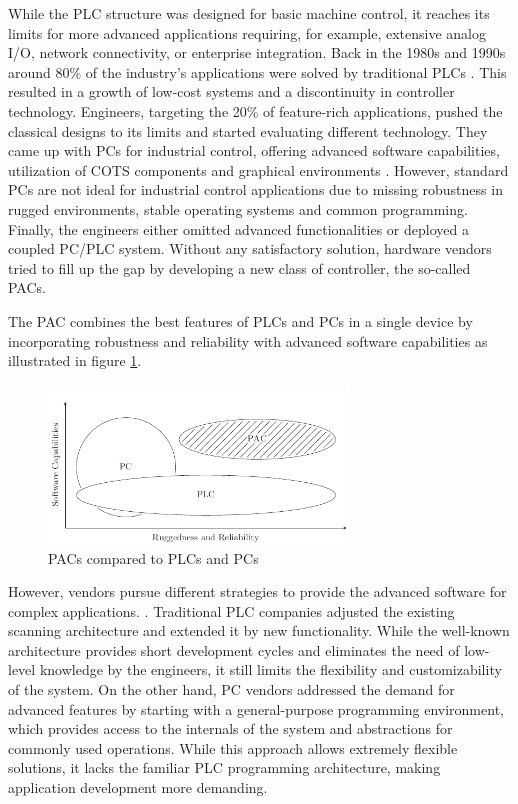 While the \ac{PLC} structure was designed for basic machine control, it
reaches its limits for more advanced applications requiring, for example,
extensive analog I/O, network connectivity, or enterprise integration. Back in
the 1980s and 1990s around 80\% of the industry's applications were solved by
traditional \acp{PLC} \citep{bel05}. This resulted in a growth of low-cost
systems and a discontinuity in controller technology. Engineers, targeting the
20\% of feature-rich applications, pushed the classical designs to its limits
and started evaluating different technology. They came up with \acp{PC} for
industrial control, offering advanced software capabilities, utilization of
\ac{COTS} components and graphical environments \citep{bel05}. However,
standard \acp{PC} are not ideal for industrial control applications due to
missing robustness in rugged environments, stable operating systems and common
programming. Finally, the engineers either omitted advanced functionalities or
deployed a coupled \ac{PC}/\ac{PLC} system. Without any satisfactory solution,
hardware vendors tried to fill up the gap by developing a new class of
controller, the so-called \acp{PAC}.

The \ac{PAC} combines the best features of \acp{PLC} and \acp{PC} in a single
device by incorporating robustness and reliability with advanced software
capabilities as illustrated in figure \ref{fig:pac}.
\begin{figure}[tb]
	\centering
	\includegraphics[width=8cm]{../figures/pac}
	\caption{\acsp{PAC} compared to \acsp{PLC} and \acsp{PC} \citep[adapted from][]{bel05}}
	\label{fig:pac}
\end{figure}
However, vendors pursue different strategies to provide the advanced software
for complex applications. \citep{bel05}. Traditional \ac{PLC} companies
adjusted the existing scanning architecture and extended it by new
functionality. While the well-known architecture provides short development
cycles and eliminates the need of low-level knowledge by the engineers, it
still limits the flexibility and customizability of the system. On the other
hand, \ac{PC} vendors addressed the demand for advanced features by starting
with a general-purpose programming environment, which provides access to the
internals of the system and abstractions for commonly used operations. While
this approach allows extremely flexible solutions, it lacks the familiar
\ac{PLC} programming architecture, making application development more
demanding.


